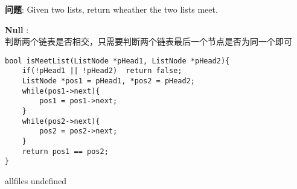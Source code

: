 \documentclass{article}
\begin{document}
\begin{CJK}{UTF8}{gbsn}     %

\else
    
\begin{description}
    \item{\textbf{问题}}: Given two lists, return wheather the two lists meet.
    \item{\textbf{Null}} : 
    \\判断两个链表是否相交，只需要判断两个链表最后一个节点是否为同一个即可
    \begin{lstlisting}
bool isMeetList(ListNode *pHead1, ListNode *pHead2){
	if(!pHead1 || !pHead2)	return false;
	ListNode *pos1 = pHead1, *pos2 = pHead2;
	while(pos1->next){
		pos1 = pos1->next;
	}
	while(pos2->next){
		pos2 = pos2->next;
	}
	return pos1 == pos2;
}
    \end{lstlisting}
\end{description}

\fi

\ifx allfiles undefined
\end{CJK}
\end{document}
